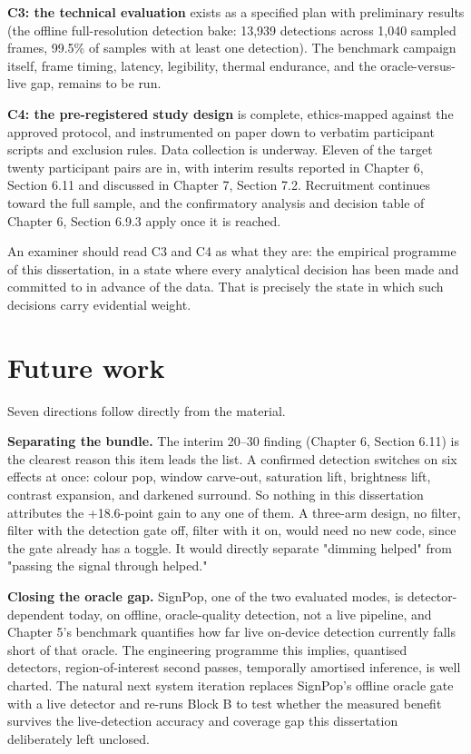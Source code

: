 \textbf{C3: the technical evaluation} exists as a specified plan with preliminary results (the offline
full-resolution detection bake: 13,939 detections across 1,040 sampled frames, 99.5\% of samples with
at least one detection). The benchmark campaign itself, frame timing, latency, legibility, thermal
endurance, and the oracle-versus-live gap, remains to be run.

\textbf{C4: the pre-registered study design} is complete, ethics-mapped against the approved protocol,
and instrumented on paper down to verbatim participant scripts and exclusion rules. Data collection is
underway. Eleven of the target twenty participant pairs are in, with interim results reported in
Chapter 6, Section 6.11 and discussed in Chapter 7, Section 7.2. Recruitment continues toward the
full sample, and the confirmatory analysis and decision table of Chapter 6, Section 6.9.3 apply once
it is reached.

An examiner should read C3 and C4 as what they are: the empirical programme of this dissertation, in
a state where every analytical decision has been made and committed to in advance of the data. That
is precisely the state in which such decisions carry evidential weight.

\section{Future work}

Seven directions follow directly from the material.

\textbf{Separating the bundle.} The interim 20–30\textdegree{} finding (Chapter 6, Section 6.11) is
the clearest reason this item leads the list. A confirmed detection switches on six effects at once:
colour pop, window carve-out, saturation lift, brightness lift, contrast expansion, and darkened
surround. So nothing in this dissertation attributes the +18.6-point gain to any one of them. A
three-arm design, no filter, filter with the detection gate off, filter with it on, would need no new
code, since the gate already has a toggle. It would directly separate "dimming helped" from "passing
the signal through helped."

\textbf{Closing the oracle gap.} SignPop, one of the two evaluated modes, is detector-dependent today,
on offline, oracle-quality detection, not a live pipeline, and Chapter 5's benchmark quantifies how
far live on-device detection currently falls short of that oracle. The engineering programme this
implies, quantised detectors, region-of-interest second passes, temporally amortised inference, is
well charted. The natural next system iteration replaces SignPop's offline oracle gate with a live
detector and re-runs Block B to test whether the measured benefit survives the live-detection
accuracy and coverage gap this dissertation deliberately left unclosed.

